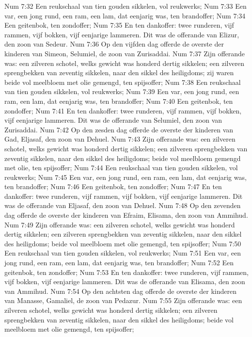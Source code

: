 Num 7:32  Een reukschaal van tien gouden sikkelen, vol reukwerks;
Num 7:33  Een var, een jong rund, een ram, een lam, dat eenjarig was, ten brandoffer;
Num 7:34  Een geitenbok, ten zondoffer;
Num 7:35  En ten dankoffer: twee runderen, vijf rammen, vijf bokken, vijf eenjarige lammeren. Dit was de offerande van Elizur, den zoon van Sedeur.
Num 7:36  Op den vijfden dag offerde de overste der kinderen van Simeon, Selumiel, de zoon van Zurisaddai.
Num 7:37  Zijn offerande was: een zilveren schotel, welks gewicht was honderd dertig sikkelen; een zilveren sprengbekken van zeventig sikkelen, naar den sikkel des heiligdoms; zij waren beide vol meelbloem met olie gemengd, ten spijsoffer;
Num 7:38  Een reukschaal van tien gouden sikkelen, vol reukwerks;
Num 7:39  Een var, een jong rund, een ram, een lam, dat eenjarig was, ten brandoffer;
Num 7:40  Een geitenbok, ten zondoffer;
Num 7:41  En ten dankoffer: twee runderen, vijf rammen, vijf bokken, vijf eenjarige lammeren. Dit was de offerande van Selumiel, den zoon van Zurisaddai.
Num 7:42  Op den zesden dag offerde de overste der kinderen van Gad, Eljasaf, den zoon van Dehuel.
Num 7:43  Zijn offerande was: een zilveren schotel, welks gewicht was honderd dertig sikkelen; een zilveren sprengbekken van zeventig sikkelen, naar den sikkel des heiligdoms; beide vol meelbloem gemengd met olie, ten spijsoffer;
Num 7:44  Een reukschaal van tien gouden sikkelen, vol reukwerks;
Num 7:45  Een var, een jong rund, een ram, een lam, dat eenjarig was, ten brandoffer;
Num 7:46  Een geitenbok, ten zondoffer;
Num 7:47  En ten dankoffer: twee runderen, vijf rammen, vijf bokken, vijf eenjarige lammeren. Dit was de offerande van Eljasaf, den zoon van Dehuel.
Num 7:48  Op den zevenden dag offerde de overste der kinderen van Efraim, Elisama, den zoon van Ammihud.
Num 7:49  Zijn offerande was: een zilveren schotel, welks gewicht was honderd dertig sikkelen; een zilveren sprengbekken van zeventig sikkelen, naar den sikkel des heiligdoms; beide vol meelbloem met olie gemengd, ten spijsoffer;
Num 7:50  Een reukschaal van tien gouden sikkelen, vol reukwerks;
Num 7:51  Een var, een jong rund, een ram, een lam, dat eenjarig was, ten brandoffer;
Num 7:52  Een geitenbok, ten zondoffer;
Num 7:53  En ten dankoffer: twee runderen, vijf rammen, vijf bokken, vijf eenjarige lammeren. Dit was de offerande van Elisama, den zoon van Ammihud.
Num 7:54  Op den achtsten dag offerde de overste der kinderen van Manasse, Gamaliel, de zoon van Pedazur.
Num 7:55  Zijn offerande was: een zilveren schotel, welks gewicht was honderd dertig sikkelen; een zilveren sprengbekken van zeventig sikkelen, naar den sikkel des heiligdoms; beide vol meelbloem met olie gemengd, ten spijsoffer;
